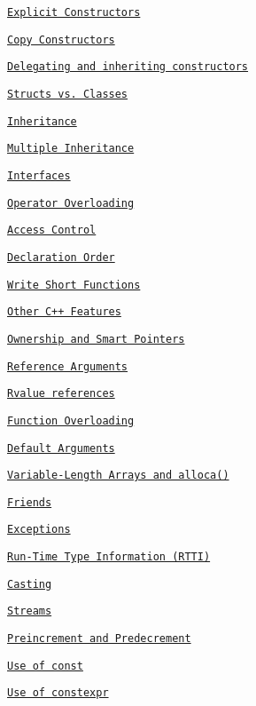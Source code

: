 \begin{DoxyItemize}
\begin{DoxyItemize}
\item \href{#explicit-constructors}{\tt Explicit Constructors}
\item \href{#copy-constructors}{\tt Copy Constructors}
\item \href{#delegating-and-inheriting-constructors}{\tt Delegating and inheriting constructors}
\item \href{#structs-vs-classes}{\tt Structs vs. Classes}
\item \href{#inheritance}{\tt Inheritance}
\item \href{#multiple-inheritance}{\tt Multiple Inheritance}
\item \href{#interfaces}{\tt Interfaces}
\item \href{#operator-overloading}{\tt Operator Overloading}
\item \href{#access-control}{\tt Access Control}
\item \href{#declaration-order}{\tt Declaration Order}
\item \href{#write-short-functions}{\tt Write Short Functions}
\end{DoxyItemize}
\item \href{#other-c-features}{\tt Other C++ Features}
\begin{DoxyItemize}
\item \href{#ownership-and-smart-pointers}{\tt Ownership and Smart Pointers}
\item \href{#reference-arguments}{\tt Reference Arguments}
\item \href{#rvalue-references}{\tt Rvalue references}
\item \href{#function-overloading}{\tt Function Overloading}
\item \href{#default-arguments}{\tt Default Arguments}
\item \href{#variable-length-arrays-and-alloca}{\tt Variable-\/\+Length Arrays and alloca()}
\item \href{#friends}{\tt Friends}
\item \href{#exceptions}{\tt Exceptions}
\item \href{#run-time-type-information-rtti}{\tt Run-\/\+Time Type Information (R\+T\+TI)}
\item \href{#casting}{\tt Casting}
\item \href{#streams}{\tt Streams}
\item \href{#preincrement-and-predecrement}{\tt Preincrement and Predecrement}
\item \href{#use-of-const}{\tt Use of const}
\item \href{#use-of-constexpr}{\tt Use of constexpr}

\end{DoxyItemize}
\end{DoxyItemize}
